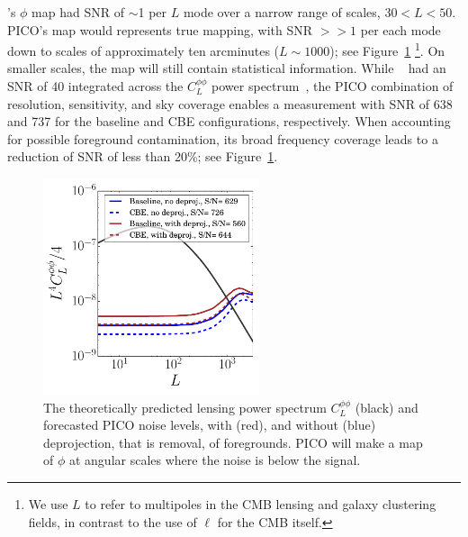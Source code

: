 \documentclass[PICOReport.tex]{subfiles}
\begin{document}
\planck 's $\phi$ map had \ac{SNR} of $\sim$1 per $L$ mode over a narrow range of scales, $30 < L < 50$. PICO's map would represents true mapping, with \ac{SNR} $>>1$ per each mode down to scales of approximately ten arcminutes ($L \sim 1000$); see Figure~\ref{fig:lensingNoisePICO} \footnote{We use $L$ to refer to multipoles in the CMB lensing and galaxy clustering fields, in contrast to the use of $\ell$  for the CMB itself. }.  On smaller scales, the map will still contain statistical information. While \planck~  had an \ac{SNR} of 40 integrated across the $C_{L}^{\phi \phi}$ power spectrum~\citep{2018arXiv180706210P}, the PICO combination of resolution, sensitivity, and sky coverage enables a measurement with SNR of 638 and 737 for the baseline and CBE configurations, respectively.  When accounting for possible foreground contamination, its broad frequency coverage leads to a reduction of SNR of less than 20\%; see Figure~\ref{fig:lensingNoisePICO}.  


\begin{figure}
\hspace{-0.2in}
\parbox{3.0in}{\centerline {
\includegraphics[width=2.5in]{images/lensingNoisePICO.pdf} } }
\hspace{0.in}
\parbox{3.3in}{
\caption{ \label{fig:lensingNoisePICO} The theoretically predicted lensing power spectrum $C_{L}^{\phi \phi}$ (black) and forecasted PICO noise levels, with (red), and without (blue) deprojection, that is removal, of foregrounds. PICO will make a map of $\phi$ at angular scales where the noise is below the signal.  
} }
\vspace{-0.1in}
\end{figure}
\end{document}
